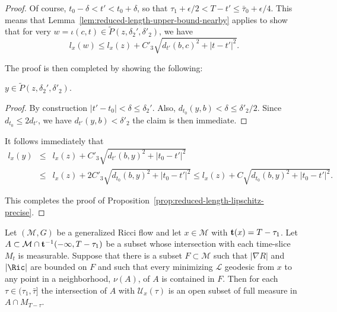 \begin{proof}
Of course, $t_0-\delta<t'<t_0+\delta$, so that
$\tau_1+\epsilon/2<T-t'\le \bar\tau_0+\epsilon/4$. This means that
Lemma~\ref{lem:reduced-length-upper-bound-nearby} applies to show that for very $w=\iota(c,t)\in
\widetilde P(z,\delta_2',\delta'_2)$,  we have
$$l_x(w)\le l_x(z)+C'_3\sqrt{d_{t'}(b,c)^2+|t-t'|^2}.$$


The proof is then completed by showing the following:

\begin{claim}\label{claim:point-in-parabolic-neighborhood}
$y\in \widetilde P(z,\delta_2',\delta'_2)$.
\end{claim}

\begin{proof}
By construction $|t'-t_0|<\delta\le \delta_2'$. Also,
$d_{t_0}(y,b)<\delta\le \delta'_2/2$. Since $d_{t_0}\le 2d_{t'}$, we
have $d_{t'}(y,b)< \delta'_2$ the claim is then immediate.
\end{proof}

It follows immediately that \begin{eqnarray*} l_x(y) & \le &
l_x(z)+C'_3\sqrt{d_{t'}(b,y)^2+|t_0-t'|^2} \\ & \le & l_x(z)+2
C'_3\sqrt{d_{t_0}(b,y)^2+|t_0-t'|^2}\le
l_x(z)+C\sqrt{d_{t_0}(b,y)^2+|t_0-t'|^2}.
\end{eqnarray*}

This completes the proof of Proposition~\ref{prop:reduced-length-lipschitz-precise}.
\end{proof}

\begin{corollary}\label{cor:reduced-length-full-measure}
\label{fullmeasure}
Let $({\mathcal M},G)$ be a generalized Ricci flow and let $x\in {\mathcal M}$
with ${\bf t}(x)=T-\tau_1$. Let
 $A\subset {\mathcal
M}\cap {\bf t}^{-1}(-\infty,T-\tau_1)$ be a subset whose intersection with each
time-slice $M_t$ is measurable. Suppose that there is a  subset $F\subset
{\mathcal M}$ such that $|\nabla R|$ and $|\Ric|$ are bounded on $F$ and
such that every minimizing ${\mathcal L}$ geodesic from $x$ to any point in a
neighborhood, $\nu(A)$, of $A$ is contained in $F$. Then for each $\tau\in
(\tau_1,\bar\tau]$ the intersection of $A$ with ${\mathcal U}_x(\tau)$ is an
open subset of full measure in $A\cap M_{T-\tau}$.
\end{corollary}

